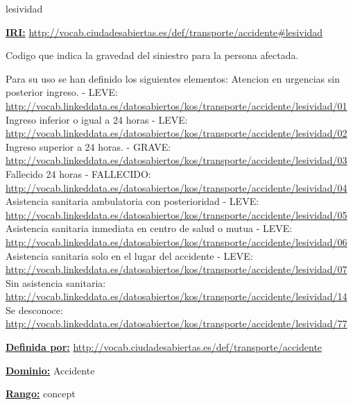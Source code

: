 \begin{mybox}{lesividad}
\begin{flushleft}
\underline{\textbf{IRI:}}
\url{http://vocab.ciudadesabiertas.es/def/transporte/accidente#lesividad}
\newline

Codigo que indica la gravedad del siniestro para la persona afectada.
\newline

Para su uso se han definido los siguientes elementos:
 Atencion en urgencias sin posterior ingreso. - LEVE:
\newline \url{http://vocab.linkeddata.es/datosabiertos/kos/transporte/accidente/lesividad/01}
 Ingreso inferior o igual a 24 horas - LEVE:
\newline \url{http://vocab.linkeddata.es/datosabiertos/kos/transporte/accidente/lesividad/02}
 Ingreso superior a 24 horas. - GRAVE:
\newline \url{http://vocab.linkeddata.es/datosabiertos/kos/transporte/accidente/lesividad/03}
 Fallecido 24 horas - FALLECIDO:
\newline \url{http://vocab.linkeddata.es/datosabiertos/kos/transporte/accidente/lesividad/04}
 Asistencia sanitaria ambulatoria con posterioridad - LEVE:
\newline \url{http://vocab.linkeddata.es/datosabiertos/kos/transporte/accidente/lesividad/05}
 Asistencia sanitaria inmediata en centro de salud o mutua - LEVE:
\newline \url{http://vocab.linkeddata.es/datosabiertos/kos/transporte/accidente/lesividad/06}
 Asistencia sanitaria solo en el lugar del accidente - LEVE:
\newline \url{http://vocab.linkeddata.es/datosabiertos/kos/transporte/accidente/lesividad/07}
 Sin asistencia sanitaria:
\newline \url{http://vocab.linkeddata.es/datosabiertos/kos/transporte/accidente/lesividad/14}
 Se desconoce:
\newline \url{http://vocab.linkeddata.es/datosabiertos/kos/transporte/accidente/lesividad/77}
\newline


\underline{\textbf{Definida por:}}
\newline \url{http://vocab.ciudadesabiertas.es/def/transporte/accidente}
\newline

\underline{\textbf{Dominio:}}  Accidente
\newline

\underline{\textbf{Rango:}} concept
\newline

\end{flushleft}
\end{mybox}
